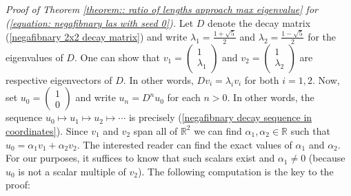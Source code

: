 \documentclass[reqno]{amsart}
\theoremstyle{definition}
\newcommand{\R}{\mathbb{R}}
\begin{document}
\noindent\emph{Proof of Theorem \ref{theorem:: ratio of lengths approach max eigenvalue} for (\ref{equation: negafibnary las with seed 0}).} Let $D$ denote the decay matrix (\ref{negafibnary 2x2 decay matrix}) and write $\lambda_1=\frac{1+\sqrt{5}}{2}$ and $\lambda_2=\frac{1-\sqrt{5}}{2}$ for the eigenvalues of $D$. One can show that
$v_1=\begin{pmatrix}
    1 \\
    \lambda_1
\end{pmatrix}$ and 
$v_2=\begin{pmatrix}
    1 \\
    \lambda_2
\end{pmatrix}$ are respective eigenvectors of $D$. In other words, $Dv_i=\lambda_i v_i$ for both $i=1,2$. Now, set 
$u_0=\begin{pmatrix}
    1 \\
    0
\end{pmatrix}$ and write $u_n=D^nu_0$ for each $n>0$. In other words, the sequence $u_0\mapsto u_1\mapsto u_2\mapsto\cdots$ is precisely (\ref{negafibnary decay sequence in coordinates}). Since $v_1$ and $v_2$ span all of $\R^2$ we can find $\alpha_1,\alpha_2\in\R$ such that $u_0=\alpha_1v_1+\alpha_2v_2$. The interested reader can find the exact values of $\alpha_1$ and $\alpha_2$. For our purposes, it suffices to know that such scalars exist and $\alpha_1\not=0$ (because $u_0$ is not a scalar multiple of $v_2$). The following computation is the key to the proof:
\end{document}
